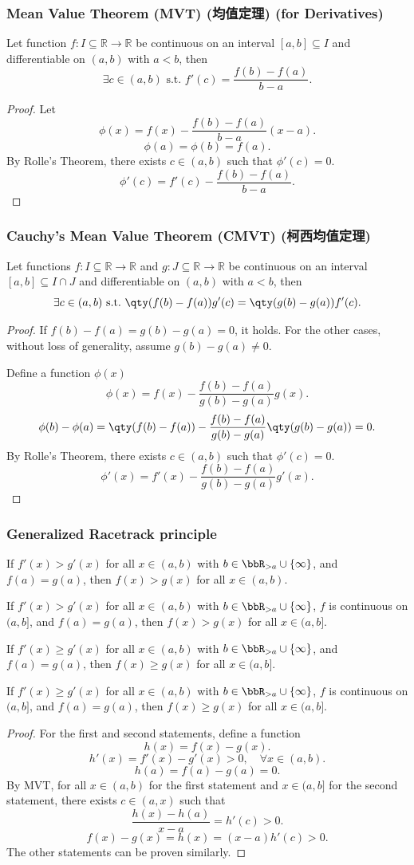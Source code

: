 \subsubsection{Mean Value Theorem (MVT) (均值定理) (for Derivatives)}
Let function $f\colon I\subseteq\mathbb{R}\to\mathbb{R}$ be continuous on an interval $[a, b]\subseteq I$ and differentiable on $(a,b)$ with $a<b$, then
\[\exists c\in (a, b)\text{\ s.t.\ }f'(c)=\frac{f(b)-f(a)}{b-a}.\]
\begin{proof}
Let
\[\phi(x) = f(x) - \frac{f(b)-f(a)}{b-a} (x-a).\]
\[\phi(a)=\phi(b)=f(a).\]
By Rolle's Theorem, there exists $c\in (a,b)$ such that $\phi'(c)=0$.
\[\phi'(c)=f'(c)-\frac{f(b)-f(a)}{b-a}.\]
\end{proof}
\subsubsection{Cauchy's Mean Value Theorem (CMVT) (柯西均值定理)}
Let functions $f\colon I\subseteq\mathbb{R}\to\mathbb{R}$ and $g\colon J\subseteq\mathbb{R}\to\mathbb{R}$ be continuous on an interval $[a, b]\subseteq I\cap J$ and differentiable on $(a,b)$ with $a<b$, then
\[\exists c\in (a,b)\text{\ s.t.\ }\qty(f(b)-f(a))g'(c)=\qty(g(b)-g(a))f'(c).\]
\begin{proof}
    If $f(b)-f(a)=g(b)-g(a)=0$, it holds. For the other cases, without loss of generality, assume $g(b)-g(a)\neq 0$.

    Define a function $\phi(x)$
    \[\phi(x)=f(x)-\frac{f(b)-f(a)}{g(b)-g(a)}g(x).\]
    \[\phi(b)-\phi(a)=\qty(f(b)-f(a))-\frac{f(b)-f(a)}{g(b)-g(a)}\qty(g(b)-g(a))=0.\]
    By Rolle's Theorem, there exists $c\in (a,b)$ such that $\phi'(c)=0$.
    \[\phi'(x)=f'(x)-\frac{f(b)-f(a)}{g(b)-g(a)}g'(x).\]
\end{proof}
\subsubsection{Generalized Racetrack principle}
If $f'(x)>g'(x)$ for all $x\in (a,b)$ with $b\in\bbR_{>a}\cup\{\infty\}$, and $f(a)=g(a)$, then $f(x)>g(x)$ for all $x\in(a,b)$.

If $f'(x)>g'(x)$ for all $x\in (a,b)$ with $b\in\bbR_{>a}\cup\{\infty\}$, $f$ is continuous on $(a,b]$, and $f(a)=g(a)$, then $f(x)>g(x)$ for all $x\in(a,b]$.

If $f'(x)\geq g'(x)$ for all $x\in (a,b)$ with $b\in\bbR_{>a}\cup\{\infty\}$, and $f(a)=g(a)$, then $f(x)\geq g(x)$ for all $x\in(a,b]$.

If $f'(x)\geq g'(x)$ for all $x\in (a,b)$ with $b\in\bbR_{>a}\cup\{\infty\}$, $f$ is continuous on $(a,b]$, and $f(a)=g(a)$, then $f(x)\geq g(x)$ for all $x\in(a,b]$.
\begin{proof}
    For the first and second statements, define a function
    \[h(x)=f(x)-g(x).\]
    \[h'(x)=f'(x)-g'(x)>0,\quad\forall x\in(a,b).\]
    \[h(a)=f(a)-g(a)=0.\]
    By MVT, for all $x\in(a,b)$ for the first statement and $x\in(a,b]$ for the second statement, there exists $c\in(a,x)$ such that
    \[\frac{h(x)-h(a)}{x-a}=h'(c)>0.\]
    \[f(x)-g(x)=h(x)=(x-a)h'(c)>0.\]
    The other statements can be proven similarly.
\end{proof}
